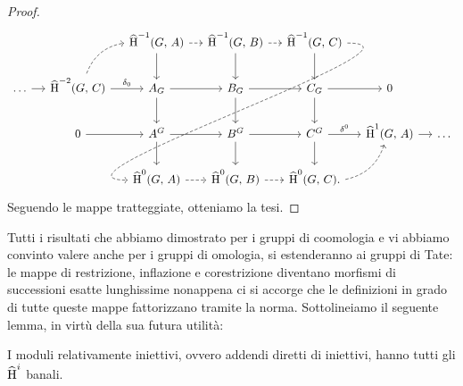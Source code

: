 \begin{proof}
	\[\begin{tikzcd}[column sep = small]
	&& \Hh^{-1}(G, \, A) \dar \rar[dashed]
	& \Hh^{-1}(G, \, B) \dar \rar[dashed]
	& \Hh^{-1}(G, \, C) \dar \ar[out=0, in=180, looseness=1, dashed]{dddll} %
	&& \\
	\dots \rar
	& \Hh^{-2}(G, \, C) \rar["\delta_0"] \arrow[ur, dashed, bend left = 30]
	& A_G \rar \dar 
	& B_G \rar \arrow[d]
	& C_G \rar \dar
	& 0 & \\
	& 0 \rar
	&A^G \rar\dar
	& B^G \rar\dar
	& C^G \rar["\delta^0"]\dar
	& \Hh^1(G, \, A) \rar
	& \dots \\
	&& \Hh^{0}(G, \, A) \rar[dashed]
	& \Hh^{0}(G, \, B)  \rar[dashed]
	& \Hh^{0}(G, \, C). \arrow[ur, dashed, bend right = 30]
	&&
	\end{tikzcd}\]
	Seguendo le mappe tratteggiate, otteniamo la tesi.
\end{proof}

Tutti i risultati che abbiamo dimostrato per i gruppi di coomologia e vi abbiamo convinto valere anche per i gruppi di omologia, si estenderanno ai gruppi di Tate: le mappe di restrizione, inflazione e corestrizione diventano morfismi di successioni esatte lunghissime nonappena ci si accorge che le definizioni in grado di tutte queste mappe fattorizzano tramite la norma. Sottolineiamo il seguente lemma, in virtù della sua futura utilità:

\begin{lemma}
	I moduli relativamente iniettivi, ovvero addendi diretti di iniettivi, hanno tutti gli $ \operatorname{\widehat{H}}^i $ banali.
\end{lemma}



